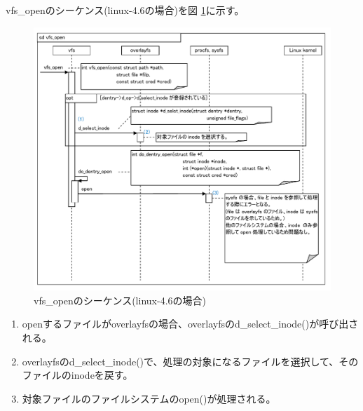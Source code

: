 \documentclass[twoside,11pt,fleqn]{book}
\begin{document}
{vfs\_openのシーケンス(linux-4.6の場合)を図 \ref{figure:chap05_fig003}に示す。
\begin{figure}[ht]
  \includegraphics[scale=0.85]{figs/chap05_fig003.pdf}
  \caption{vfs\_openのシーケンス(linux-4.6の場合)}
  \label{figure:chap05_fig003}
\end{figure}

\begin{enumerate}
  \item openするファイルがoverlayfsの場合、overlayfsのd\_select\_inode()が呼び出される。
  \item overlayfsのd\_select\_inode()で、処理の対象になるファイルを選択して、そのファイルのinodeを戻す。
  \item 対象ファイルのファイルシステムのopen()が処理される。
\end{enumerate}
}
\end{document}
